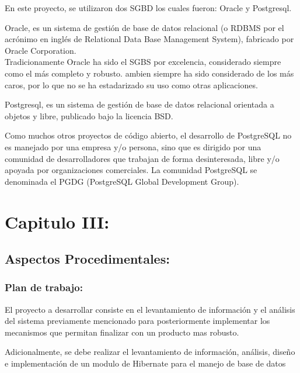 \documentclass[spanish]{article}
\begin{document}
En este proyecto, se utilizaron dos SGBD los cuales fueron: Oracle y Postgresql.

Oracle, es un sistema de gestión de base de datos relacional (o RDBMS por el acrónimo en inglés de Relational Data Base Management System), fabricado por Oracle Corporation.
\\
 Tradicionamente Oracle ha sido el SGBS por excelencia, considerado siempre como el más completo y robusto. ambien siempre ha sido considerado de los más caros, por lo que no se ha estadarizado su uso como otras aplicaciones.
 
 Postgresql, es un sistema de gestión de base de datos relacional orientada a objetos y libre, publicado bajo la licencia BSD.
 
 Como muchos otros proyectos de código abierto, el desarrollo de PostgreSQL no es manejado por una empresa y/o persona, sino que es dirigido por una comunidad de desarrolladores que trabajan de forma desinteresada, libre y/o apoyada por organizaciones comerciales. La comunidad PostgreSQL se denominada el PGDG (PostgreSQL Global Development Group).
 

\section{Capitulo III:}

\subsection{Aspectos Procedimentales:}

\subsubsection{Plan de trabajo:}

El proyecto a desarrollar consiste en el levantamiento de información y el análisis del sistema previamente mencionado para posteriormente implementar los mecanismos que permitan finalizar con un producto mas robusto.

Adicionalmente, se debe realizar el levantamiento de información, análisis, diseño e implementación de un modulo de Hibernate para el manejo de base de datos
\end{document}
